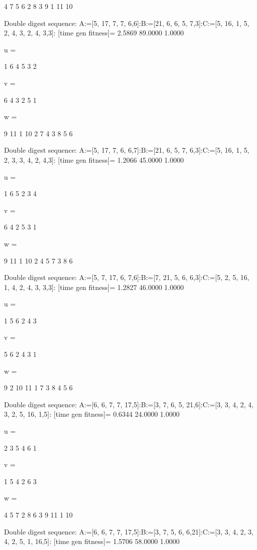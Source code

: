      4     7     5     6     2     8     3     9     1    11    10

Double digest sequence:
A:=[5, 17, 7, 7, 6,6]:B:=[21, 6, 6, 5, 7,3]:C:=[5, 16, 1, 5, 2, 4, 3, 2, 4, 3,3]:
[time gen fitness]=
    2.5869   89.0000    1.0000


u =

     1     6     4     5     3     2


v =

     6     4     3     2     5     1


w =

     9    11     1    10     2     7     4     3     8     5     6

Double digest sequence:
A:=[5, 17, 7, 6, 6,7]:B:=[21, 6, 5, 7, 6,3]:C:=[5, 16, 1, 5, 2, 3, 3, 4, 2, 4,3]:
[time gen fitness]=
    1.2066   45.0000    1.0000


u =

     1     6     5     2     3     4


v =

     6     4     2     5     3     1


w =

     9    11     1    10     2     4     5     7     3     8     6

Double digest sequence:
A:=[5, 7, 17, 6, 7,6]:B:=[7, 21, 5, 6, 6,3]:C:=[5, 2, 5, 16, 1, 4, 2, 4, 3, 3,3]:
[time gen fitness]=
    1.2827   46.0000    1.0000


u =

     1     5     6     2     4     3


v =

     5     6     2     4     3     1


w =

     9     2    10    11     1     7     3     8     4     5     6

Double digest sequence:
A:=[6, 6, 7, 7, 17,5]:B:=[3, 7, 6, 5, 21,6]:C:=[3, 3, 4, 2, 4, 3, 2, 5, 16, 1,5]:
[time gen fitness]=
    0.6344   24.0000    1.0000


u =

     2     3     5     4     6     1


v =

     1     5     4     2     6     3


w =

     4     5     7     2     8     6     3     9    11     1    10

Double digest sequence:
A:=[6, 6, 7, 7, 17,5]:B:=[3, 7, 5, 6, 6,21]:C:=[3, 3, 4, 2, 3, 4, 2, 5, 1, 16,5]:
[time gen fitness]=
    1.5706   58.0000    1.0000


